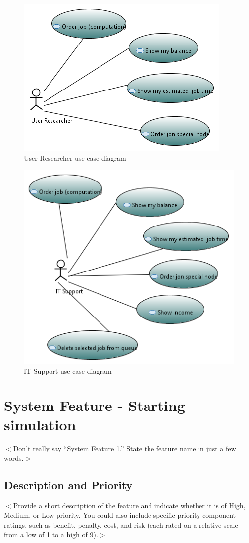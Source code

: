 \documentclass{scrreprt}
\begin{document}
\begin{figure}[h!]
\centering
\includegraphics{modelResearcher.png}
\caption{User Researcher use case diagram}
\end{figure}


\begin{figure}[h!]
\centering
\includegraphics{modelIT.png}
\caption{IT Support use case diagram}
\end{figure}

\section{System Feature - Starting simulation}
$<$Don’t really say “System Feature 1.” State the feature name in just a few 
words.$>$

\subsection{Description and Priority}
$<$Provide a short description of the feature and indicate whether it is of 
High, Medium, or Low priority. You could also include specific priority 
component ratings, such as benefit, penalty, cost, and risk (each rated on a 
relative scale from a low of 1 to a high of 9).$>$
\end{document}
